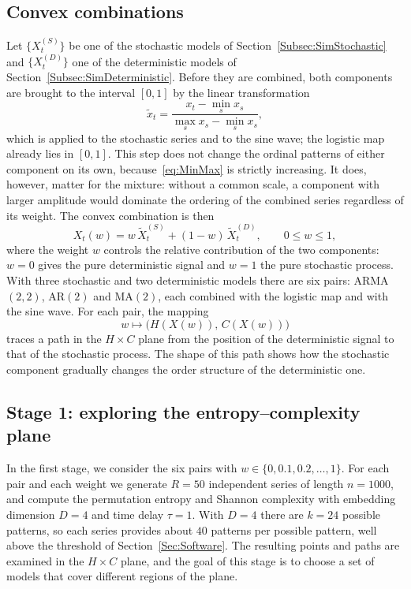 \subsection{Convex combinations}\label{Subsec:ConvexCombination}

Let $\{X^{(S)}_t\}$ be one of the stochastic models of Section~\ref{Subsec:SimStochastic} and $\{X^{(D)}_t\}$ one of the deterministic models of Section~\ref{Subsec:SimDeterministic}. Before they are combined, both components are brought to the interval $[0,1]$ by the linear transformation
\begin{equation}
	\widetilde{x}_t=\frac{x_t-\min_{s}x_s}{\max_{s}x_s-\min_{s}x_s},
	\label{eq:MinMax}
\end{equation}
which is applied to the stochastic series and to the sine wave; the logistic map already lies in $[0,1]$. This step does not change the ordinal patterns of either component on its own, because~\eqref{eq:MinMax} is strictly increasing. It does, however, matter for the mixture: without a common scale, a component with larger amplitude would dominate the ordering of the combined series regardless of its weight. The convex combination is then
\begin{equation}
	X_t(w)=w\,\widetilde{X}^{(S)}_t+(1-w)\,\widetilde{X}^{(D)}_t,\qquad 0\leq w\leq 1,
	\label{eq:ConvexCombination}
\end{equation}
where the weight $w$ controls the relative contribution of the two components: $w=0$ gives the pure deterministic signal and $w=1$ the pure stochastic process. With three stochastic and two deterministic models there are six pairs: ARMA$(2,2)$, AR$(2)$ and MA$(2)$, each combined with the logistic map and with the sine wave. For each pair, the mapping
\[
w\longmapsto\big(H(X(w)),\,C(X(w))\big)
\]
traces a path in the $H\times C$ plane from the position of the deterministic signal to that of the stochastic process. The shape of this path shows how the stochastic component gradually changes the order structure of the deterministic one.

\subsection{Stage 1: exploring the entropy--complexity plane}\label{Subsec:SimStage1}

In the first stage, we consider the six pairs with $w\in\{0,0.1,0.2,\dots,1\}$. For each pair and each weight we generate $R=50$ independent series of length $n=1000$, and compute the permutation entropy and Shannon complexity with embedding dimension $D=4$ and time delay $\tau=1$. With $D=4$ there are $k=24$ possible patterns, so each series provides about $40$ patterns per possible pattern, well above the threshold of Section~\ref{Sec:Software}. The resulting points and paths are examined in the $H\times C$ plane, and the goal of this stage is to choose a set of models that cover different regions of the plane.

